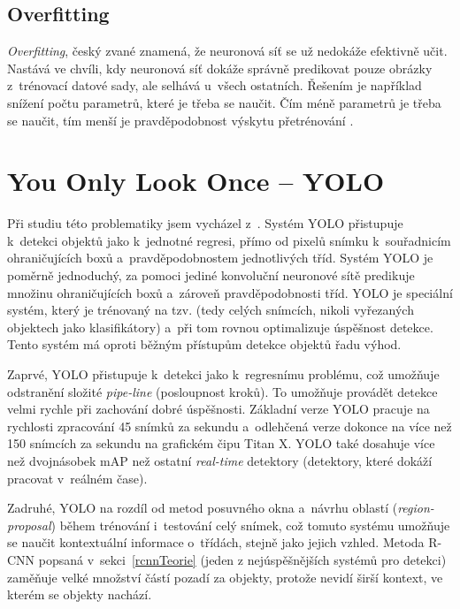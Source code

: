

\subsection*{Overfitting}
\emph{Overfitting}, český zvané  znamená, že neuronová síť se už nedokáže efektivně učit. Nastává ve chvíli, kdy neuronová síť dokáže správně predikovat pouze obrázky z~trénovací datové sady, ale selhává u~všech ostatních. Řešením je například snížení počtu parametrů, které je třeba se naučit. Čím méně parametrů je třeba se naučit, tím menší je pravděpodobnost výskytu přetrénování \cite{CNN}.



\section{You Only Look Once -- YOLO}
\label{yoloTeorie}
Při studiu této problematiky jsem vycházel z~\cite{yolov1,yolo9000,yolov3,yolov3_article,yolov123,tsdYolo}. Systém YOLO přistupuje k~detekci objektů jako k~jednotné regresi, přímo od pixelů snímku k~souřadnicím ohraničujících boxů a~pravděpodobnostem jednotlivých tříd. Systém YOLO je poměrně jednoduchý, za pomoci jediné konvoluční neuronové sítě predikuje množinu ohraničujících boxů a~zároveň pravděpodobnosti tříd. YOLO je speciální systém, který je trénovaný na tzv.  (tedy celých snímcích, nikoli vyřezaných objektech jako klasifikátory) a~při tom rovnou optimalizuje úspěšnost detekce. Tento systém má oproti běžným přístupům detekce objektů řadu výhod.

Zaprvé, YOLO přistupuje k~detekci jako k~regresnímu problému, což umožňuje odstranění složité \emph{pipe-line} (posloupnost kroků). To umožňuje provádět detekce velmi rychle při zachování dobré úspěšnosti. Základní verze YOLO pracuje na rychlosti zpracování 45 snímků za sekundu a~odlehčená verze dokonce na více než 150 snímcích za sekundu na grafickém čipu Titan X. YOLO také dosahuje více než dvojnásobek mAP než ostatní \emph{real-time} detektory (detektory, které dokáží pracovat v~reálném čase).

Zadruhé, YOLO na rozdíl od metod posuvného okna a~návrhu oblastí (\emph{region-proposal}) během trénování i~testování  celý snímek, což tomuto systému umožňuje se naučit kontextuální informace o~třídách, stejně jako jejich vzhled. Metoda R-CNN popsaná v~sekci~\ref{rcnnTeorie} (jeden z nejúspěšnějších systémů pro detekci) zaměňuje velké množství částí pozadí za objekty, protože nevidí širší kontext, ve kterém se objekty nachází.

